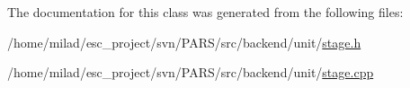 The documentation for this class was generated from the following files:\begin{DoxyCompactItemize}
\item 
/home/milad/esc\_\-project/svn/PARS/src/backend/unit/\hyperlink{stage_8h}{stage.h}\item 
/home/milad/esc\_\-project/svn/PARS/src/backend/unit/\hyperlink{stage_8cpp}{stage.cpp}\end{DoxyCompactItemize}
